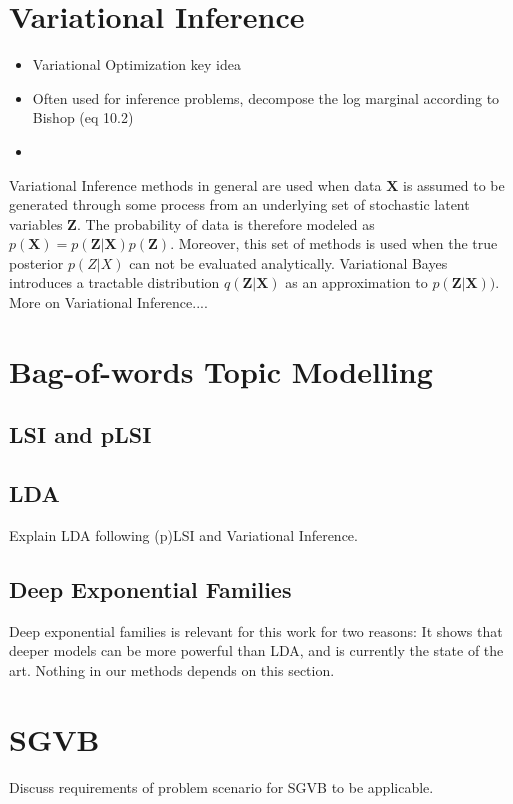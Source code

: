 \documentclass{report}
\begin{document}
\section{Variational Inference}
\begin{itemize}
	\item Variational Optimization key idea
	\item Often used for inference problems, decompose the log marginal according to Bishop (eq 10.2)
	\item 
\end{itemize}
Variational Inference methods in general are used when data $\mathbf{X}$ is assumed to be generated through some process from an underlying set of stochastic latent variables $\mathbf{Z}$. The probability of data is therefore modeled as $p(\mathbf{X}) = p(\mathbf{Z}|\mathbf{X})p(\mathbf{Z})$. Moreover, this set of methods is used when the true posterior $p(Z|X)$ can not be evaluated analytically. Variational Bayes introduces a tractable distribution $q(\mathbf{\mathbf{Z}|\mathbf{X}})$ as an approximation to $p(\mathbf{Z}|\mathbf{X}))$.
\\
More on Variational Inference....
\section{Bag-of-words Topic Modelling}

\subsection{LSI and pLSI}
\subsection{LDA}
Explain LDA following (p)LSI and Variational Inference.
\subsection{Deep Exponential Families}

Deep exponential families is relevant for this work for two reasons: It shows that deeper models can be more powerful than LDA, and is currently the state of the art. Nothing in our methods depends on this section.


\section{SGVB}\label{sgvb_section}

Discuss requirements of problem scenario for SGVB to be applicable. \\
\end{document}
